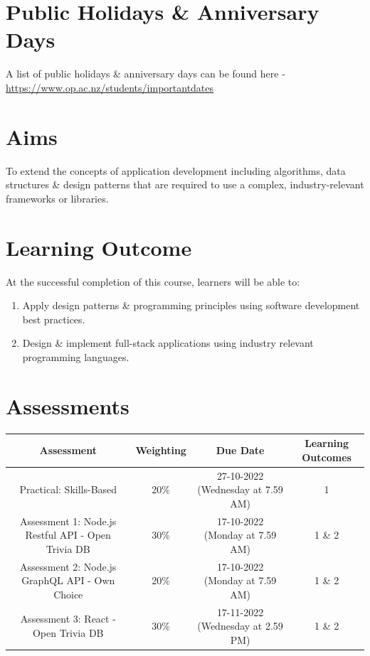 \documentclass{article}
\begin{document}
\section*{Public Holidays \& Anniversary Days}
A list of public holidays \& anniversary days can be found here - \href{https://www.op.ac.nz/students/importantdates}{https://www.op.ac.nz/students/importantdates}

\section*{Aims}
To extend the concepts of application development including algorithms, data structures \& design patterns that are required to use a complex, industry-relevant frameworks or libraries.

\section*{Learning Outcome}
At the successful completion of this course, learners will be able to:
\begin{enumerate}
	\item Apply design patterns \& programming principles using software development best practices.
	\item Design \& implement full-stack applications using industry relevant programming languages.
\end{enumerate}

\section*{Assessments}
\renewcommand{\arraystretch}{1.5}
\begin{tabular}{|c|c|c|c|}
	\hline
	\textbf{Assessment}                                 & \textbf{Weighting} & \textbf{Due Date}            & \textbf{Learning Outcomes} \\ \hline
	\small Practical: Skills-Based & \small 20\%        & \small 27-10-2022 (Wednesday at 7.59 AM)   & \small 1                   \\ \hline
	\small Assessment 1: Node.js Restful API - Open Trivia DB              & \small 30\%        & \small 17-10-2022 (Monday at 7.59 AM)  & \small 1 \& 2                   \\ \hline
	\small Assessment 2: Node.js GraphQL API - Own Choice                        & \small 20\%        & \small 17-10-2022 (Monday at 7.59 AM)  & \small 1 \& 2                   \\ \hline
	\small Assessment 3: React - Open Trivia DB                        & \small 30\%        & \small 17-11-2022 (Wednesday at 2.59 PM)  & \small 1 \& 2                   \\ \hline
\end{tabular}
\end{document}
